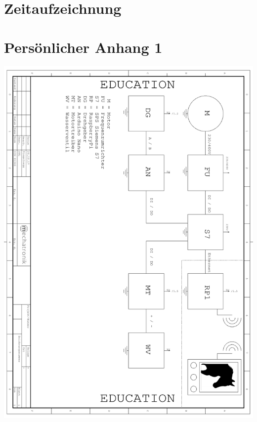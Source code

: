 \renewcommand\appendixname{Anhang}
\renewcommand\appendixpagename{Anhang}
\renewcommand\appendixtocname{Anhang}

\lohead{}

\appendix
\begingroup
\makeatletter
\let\ps@plain\ps@empty
\appendixpage
\makeatother
\endgroup

\chapter{Zeitaufzeichnung}
\chapter{Persönlicher Anhang 1}
\label{cha:anhang}


\includegraphics[scale=0.84]{fig/Blockschaltbild1}

